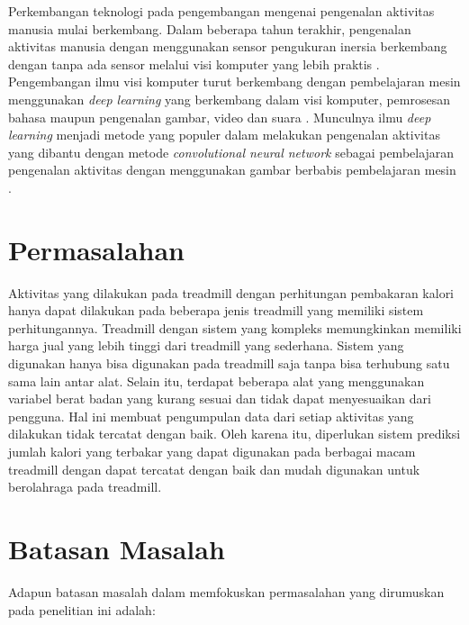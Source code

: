Perkembangan teknologi pada pengembangan mengenai pengenalan aktivitas manusia mulai berkembang. Dalam beberapa tahun terakhir, pengenalan aktivitas manusia dengan menggunakan sensor pengukuran inersia berkembang dengan tanpa ada sensor melalui visi komputer yang lebih praktis \parencite{Nouriani}. Pengembangan ilmu visi komputer turut berkembang dengan pembelajaran mesin menggunakan \emph{deep learning} yang berkembang dalam visi komputer, pemrosesan bahasa maupun pengenalan gambar, video dan suara \parencite{Chai}. Munculnya ilmu \emph{deep learning} menjadi metode yang populer dalam melakukan pengenalan aktivitas yang dibantu dengan metode \emph{convolutional neural network} sebagai pembelajaran pengenalan aktivitas dengan menggunakan gambar berbabis pembelajaran mesin \parencite{Hou}.


\section{Permasalahan}
\label{sec:permasalahan}

Aktivitas yang dilakukan pada treadmill dengan perhitungan pembakaran kalori hanya dapat dilakukan pada beberapa jenis treadmill yang memiliki sistem perhitungannya. Treadmill dengan sistem yang kompleks memungkinkan memiliki harga jual yang lebih tinggi dari treadmill yang sederhana. Sistem yang digunakan hanya bisa digunakan pada treadmill saja tanpa bisa terhubung satu sama lain antar alat. Selain itu, terdapat beberapa alat yang menggunakan variabel berat badan yang kurang sesuai dan tidak dapat menyesuaikan dari pengguna. Hal ini membuat pengumpulan data dari setiap aktivitas yang dilakukan tidak tercatat dengan baik. Oleh karena itu, diperlukan sistem prediksi jumlah kalori yang terbakar yang dapat digunakan pada berbagai macam treadmill dengan dapat tercatat dengan baik dan mudah digunakan untuk berolahraga pada treadmill. 


\section{Batasan Masalah}
\label{sec:batasanmasalah}

Adapun batasan masalah dalam memfokuskan permasalahan yang dirumuskan pada penelitian ini adalah:

